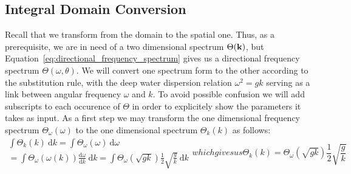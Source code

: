 \subsection{Integral Domain Conversion}
%
Recall that we transform from the  \wavenumber domain to the spatial 
one. Thus, as a prerequisite, we are in need of a two dimensional \wavenumber 
spectrum $\Theta(\mathbf{k})$, but 
Equation~\ref{eq:directional_frequency_spectrum} 
gives us a directional frequency spectrum $\Theta(\omega,\theta)$. We will 
convert one spectrum form to the other according to the substitution rule, with 
the deep water dispersion relation $\omega^2=gk$
serving as a link between angular frequency $\omega$ and \wavenumber $k$. To 
avoid possible confusion we will add subscripts to each occurence of $\Theta$ 
in order to explicitely show the parameters it takes as input.
As a first step we may transform the one dimensional frequency spectrum 
$\Theta_{\omega}(\omega)$ to the one dimensional \wavenumber 
spectrum $\Theta_k(k)$ as follows:
\begin{subequations}
\begin{multline}
 \int\Theta_k(k)~\mathrm{d}k = \int\Theta_{\omega}(\omega)~\mathrm{d}\omega\\ = 
\int\Theta_{\omega}(\omega(k))\frac{\mathrm{d}\omega}{\mathrm{d}k}~\mathrm{d}k
= \int\Theta_{\omega}(\sqrt{gk})\frac{1}{2}\sqrt{\frac{g}{k}}~\mathrm{d}k
\end{multline}
which gives us
\begin{equation}
\label{eq:theta_k}
 \Theta_k(k) = \Theta_{\omega}(\sqrt{gk})\frac{1}{2}\sqrt{\frac{g}{k}}
\end{equation}
\end{subequations}
%
